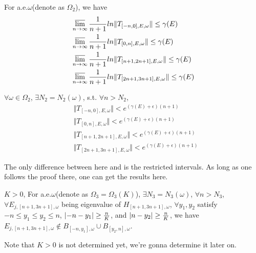 \begin{thm}
  For a.e.$\omega$(denote as $\Omega_2$), we have
  \[
    \begin{aligned}
      &\varlimsup_{n\to\infty} \frac{1}{n+1} ln\Vert T_{[-n,0],E,\omega}\Vert\leq\gamma(E)\\
      &\varlimsup_{n\to\infty} \frac{1}{n+1} ln\Vert T_{[0,n],E,\omega}\Vert\leq\gamma(E)\\
      &\varlimsup_{n\to\infty} \frac{1}{n+1} ln\Vert T_{[n+1,2n+1],E,\omega}\Vert\leq\gamma(E)\\
      &\varlimsup_{n\to\infty} \frac{1}{n+1} ln\Vert T_{[2n+1,3n+1],E,\omega}\Vert\leq\gamma(E)
    \end{aligned}
  \]
\end{thm}
\begin{cor}\label{omega2}
  $\forall \omega\in\Omega_2$, $\exists N_2=N_2(\omega)$, s.t. $\forall n>N_2$,
  \[
    \begin{aligned}
      &\Vert T_{[-n,0],E,\omega}\Vert< e^{(\gamma(E)+\epsilon)(n+1)}\\
      &\Vert T_{[0,n],E,\omega}\Vert< e^{(\gamma(E)+\epsilon)(n+1)}\\
      &\Vert T_{[n+1,2n+1],E,\omega}\Vert< e^{(\gamma(E)+\epsilon)(n+1)}\\
      &\Vert T_{[2n+1,3n+1],E,\omega}\Vert< e^{(\gamma(E)+\epsilon)(n+1)}
    \end{aligned}
  \]
\end{cor}
\begin{remark}
  The only difference between here and \cite{craig1983subharmonicity} is the restricted intervals. As long as one follows the proof there, one can get the results here.
\end{remark}
\begin{thm}\label{omega3}
   $K>0$, For a.e.$\omega$(denote as $\Omega_3=\Omega_3(K)$), $\exists N_3=N_3(\omega)$, $\forall n>N_3$, $\forall E_{j,[n+1,3n+1],\omega}$ being eigenvalue of $H_{[n+1,3n+1],\omega}$, $\forall y_1,y_2$ satisfy $-n\leq y_1\leq y_2\leq n$,  $\lvert-n-y_1\rvert\geq\frac{n}{K}$, and $\lvert n-y_2\rvert\geq\frac{n}{K}$,
 we have $E_{j,[n+1,3n+1],\omega}\notin B_{[-n,y_1],\omega}\cup B_{[y_2,n],\omega}$.
\end{thm}
\begin{remark}
  Note that $K>0$ is not determined yet, we're gonna determine it later on.
\end{remark}

